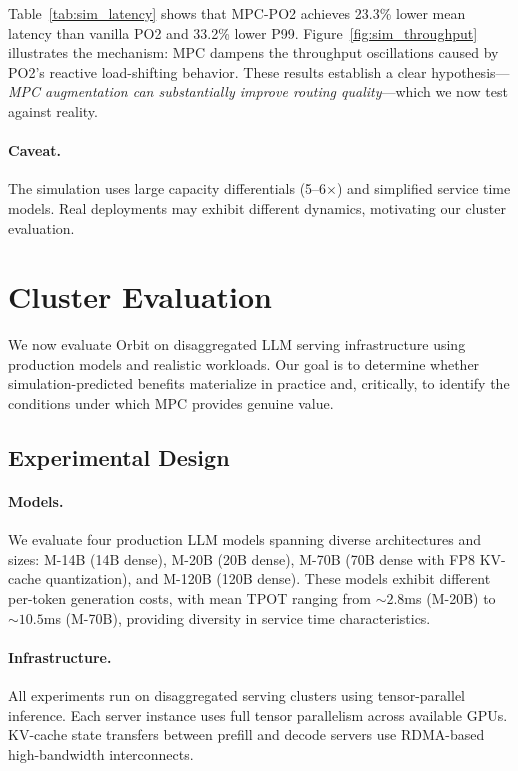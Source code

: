\documentclass[runningheads]{llncs}
\begin{document}
Table~\ref{tab:sim_latency} shows that MPC-PO2 achieves 23.3\% lower mean latency than vanilla PO2 and 33.2\% lower P99. Figure~\ref{fig:sim_throughput} illustrates the mechanism: MPC dampens the throughput oscillations caused by PO2's reactive load-shifting behavior. These results establish a clear hypothesis---\textit{MPC augmentation can substantially improve routing quality}---which we now test against reality.

\paragraph{Caveat.} The simulation uses large capacity differentials (5--6$\times$) and simplified service time models. Real deployments may exhibit different dynamics, motivating our cluster evaluation.

\section{Cluster Evaluation}
\label{sec:cluster}

We now evaluate Orbit on disaggregated LLM serving infrastructure using production models and realistic workloads. Our goal is to determine whether simulation-predicted benefits materialize in practice and, critically, to identify the conditions under which MPC provides genuine value.

\subsection{Experimental Design}

\paragraph{Models.} We evaluate four production LLM models spanning diverse architectures and sizes: M-14B (14B dense), M-20B (20B dense), M-70B (70B dense with FP8 KV-cache quantization), and M-120B (120B dense). These models exhibit different per-token generation costs, with mean TPOT ranging from ${\sim}2.8$ms (M-20B) to ${\sim}10.5$ms (M-70B), providing diversity in service time characteristics.

\paragraph{Infrastructure.} All experiments run on disaggregated serving clusters using tensor-parallel inference. Each server instance uses full tensor parallelism across available GPUs. KV-cache state transfers between prefill and decode servers use RDMA-based high-bandwidth interconnects.
\end{document}
